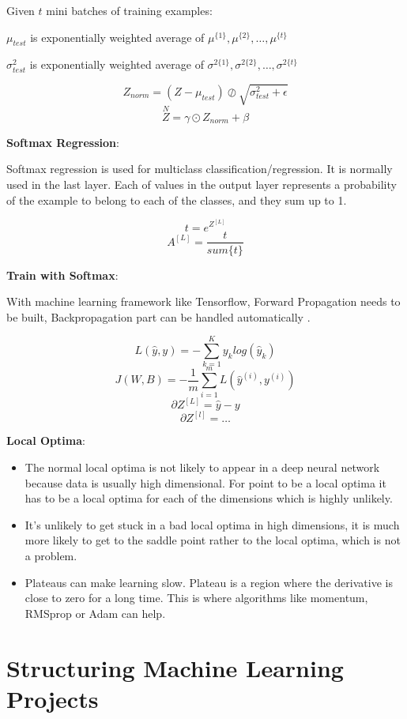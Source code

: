 \documentclass{article}
\begin{document}
\bigskip

\noindent Given \(t\) mini batches of training examples:

\noindent \(\mu_{test}\) is exponentially weighted average of \(\mu^{\{1\}}, \mu^{\{2\}}, \dots, \mu^{\{t\}}\)

\noindent \(\sigma^{2}_{test}\) is exponentially weighted average of \(\sigma^{2\{1\}}, \sigma^{2\{2\}}, \dots, \sigma^{2\{t\}}\)

\[Z_{norm} = (Z - \mu_{test}) \oslash \sqrt{\sigma^{2}_{test} + \epsilon}\]
\[\overset{N}{Z} = \gamma \odot Z_{norm} + \beta\]

\noindent \textbf{Softmax Regression}:

\noindent Softmax regression is used for multiclass classification/regression. It is normally used in the last layer. Each of values in the output layer represents a probability of the example to belong to each of the classes, and they sum up to 1.

\[t = e^{Z^{[L]}}\]
\[A^{[L]} = \frac{t}{sum\{t\}}\]

\noindent \textbf{Train with Softmax}:

\noindent With machine learning framework like Tensorflow, Forward Propagation needs to be built, Backpropagation part can be handled automatically .

\[L(\hat{y}, y) = - \sum^{K}_{k = 1} y_{k}log(\hat{y}_{k}) \]
\[J(W, B) = - \frac{1}{m} \sum_{i = 1}^{m} L(\hat{y}^{(i)}, y^{(i)})\]
\[\partial Z^{[L]} = \hat{y} - y\]
\[\partial Z^{[l]} = \dots\]

\noindent \textbf{Local Optima}:

\begin{itemize}
    \item The normal local optima is not likely to appear in a deep neural network because data is usually high dimensional. For point to be a local optima it has to be a local optima for each of the dimensions which is highly unlikely.
    \item It's unlikely to get stuck in a bad local optima in high dimensions, it is much more likely to get to the saddle point rather to the local optima, which is not a problem.
    \item Plateaus can make learning slow. Plateau is a region where the derivative is close to zero for a long time. This is where algorithms like momentum, RMSprop or Adam can help.
\end{itemize}

\section{Structuring Machine Learning Projects}
\end{document}
